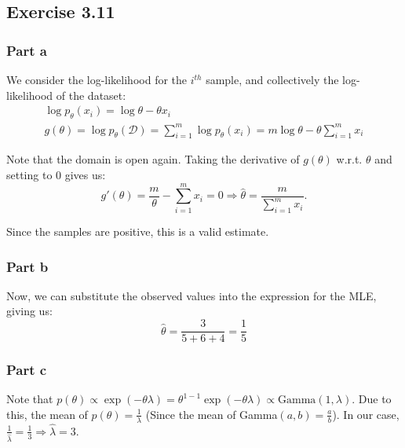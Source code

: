 \documentclass{article}
\begin{document}
\subsection*{Exercise 3.11}
\subsubsection*{Part a}
\begin{flushleft}
We consider the log-likelihood for the \(i^{th}\) sample, and collectively the log-likelihood of the dataset:
\begin{gather}
\log p_{\theta}(x_{i}) = \log \theta - \theta x_{i} \\
g(\theta) = \log p_{\theta}(\mathcal{D}) = \displaystyle \sum_{i=1}^{m} \log p_{\theta}(x_{i}) = m\log\theta - \theta \sum_{i=1}^{m} x_{i}
\end{gather}

Note that the domain is open again. Taking the derivative of \(g(\theta)\) w.r.t. \(\theta\) and setting to 0 gives us:
\begin{equation}
g'(\theta) = \frac{m}{\theta} - \sum_{i=1}^{m} x_{i} = 0 \Rightarrow \hat{\theta} = \frac{m}{\displaystyle \sum_{i=1}^{m} x_{i}}.
\end{equation}

Since the samples are positive, this is a valid estimate.
\end{flushleft}

\subsubsection*{Part b}
\begin{flushleft}
Now, we can substitute the observed values into the expression for the MLE, giving us:
\begin{equation}
\hat{\theta} = \frac{3}{5 + 6 + 4} = \frac{1}{5}
\end{equation}
\end{flushleft}

\subsubsection*{Part c}
\begin{flushleft}
Note that \(p(\theta) \propto \exp(-\theta \lambda) = \theta^{1 - 1}\exp(-\theta \lambda) \propto \text{Gamma}(1 , \lambda)\). Due to this, the mean of \(p(\theta) = \frac{1}{\lambda}\) (Since the mean of Gamma\((a, b) = \frac{a}{b}\)). In our case, \(\frac{1}{\hat{\lambda}} = \frac{1}{3} \Rightarrow \hat{\lambda} = 3\).
\end{flushleft}
\end{document}
